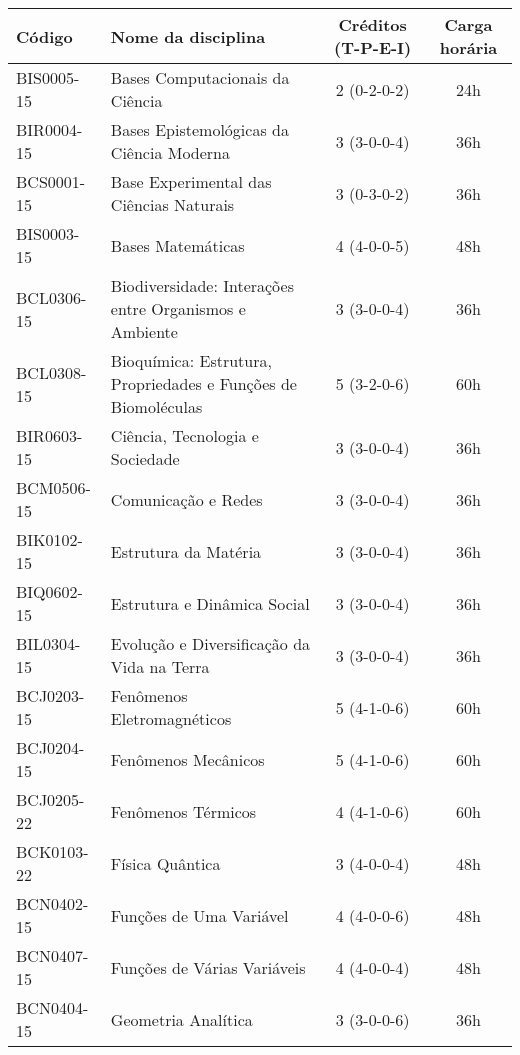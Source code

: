 \begin{table}[h!]
    \centering
    \begin{tabular}{|l|p{}|c|c|}
        \hline
        \textbf{Código} & \textbf{Nome da disciplina} & \textbf{Créditos (T-P-E-I)} & \textbf{Carga horária}\\
        \hline\hline
        BIS0005-15 & Bases Computacionais da Ciência & 2 (0-2-0-2) & 24h\\
        \hline
        BIR0004-15 & Bases Epistemológicas da Ciência Moderna & 3 (3-0-0-4) & 36h\\
        \hline
        BCS0001-15 & Base Experimental das Ciências Naturais & 3 (0-3-0-2) & 36h\\
        \hline
        BIS0003-15 & Bases Matemáticas & 4 (4-0-0-5) & 48h\\
        \hline
        BCL0306-15 & Biodiversidade: Interações entre Organismos e Ambiente & 3 (3-0-0-4) & 36h\\
        \hline
        BCL0308-15 & Bioquímica: Estrutura, Propriedades e Funções de Biomoléculas & 5 (3-2-0-6) & 60h\\
        \hline
        BIR0603-15 & Ciência, Tecnologia e Sociedade & 3 (3-0-0-4) & 36h\\
        \hline
        BCM0506-15 & Comunicação e Redes & 3 (3-0-0-4) & 36h\\
        \hline
        BIK0102-15 & Estrutura da Matéria & 3 (3-0-0-4) & 36h\\
        \hline
        BIQ0602-15 & Estrutura e Dinâmica Social & 3 (3-0-0-4) & 36h \\
        \hline
        BIL0304-15 & Evolução e Diversificação da Vida na Terra & 3 (3-0-0-4) & 36h\\
        \hline
        BCJ0203-15 & Fenômenos Eletromagnéticos & 5 (4-1-0-6) & 60h\\
        \hline
        BCJ0204-15 & Fenômenos Mecânicos & 5 (4-1-0-6) & 60h \\
        \hline
        BCJ0205-22 & Fenômenos Térmicos & 4 (4-1-0-6) & 60h\\
        \hline
        BCK0103-22 & Física Quântica & 3 (4-0-0-4) & 48h\\
        \hline
        BCN0402-15 & Funções de Uma Variável & 4 (4-0-0-6) & 48h\\
        \hline
        BCN0407-15 & Funções de Várias Variáveis & 4 (4-0-0-4) & 48h \\
        \hline
        BCN0404-15 & Geometria Analítica & 3 (3-0-0-6) & 36h\\
        \hline

\end{tabular}
\end{table}
